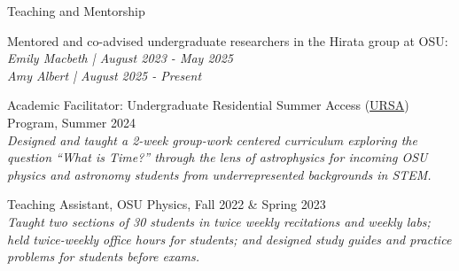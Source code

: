 \documentclass{resume} %
\begin{document}

\begin{rSection}{Teaching and Mentorship}
\begin{rSubsection}{}{}{}{}

\item Mentored and co-advised undergraduate researchers in the Hirata group at OSU:\\
\textit{Emily Macbeth | August 2023 - May 2025 }\\
\textit{Amy Albert | August 2025 - Present}
\\
\item Academic Facilitator: Undergraduate Residential Summer Access (\href{https://u.osu.edu/polaris/ursa/}{URSA}) Program, Summer 2024\\ 
\textit{Designed and taught a 2-week group-work centered curriculum exploring the question “What is Time?” through the lens of astrophysics for incoming OSU physics and astronomy students from underrepresented backgrounds in STEM.} 
\\
\item Teaching Assistant, OSU Physics, Fall 2022 \& Spring 2023\\
\textit{Taught two sections of 30 students in twice weekly recitations and weekly labs; held twice-weekly office hours for students; and designed study guides and practice problems for students before exams.}

\end{rSubsection}


\end{rSection}
\end{document}
